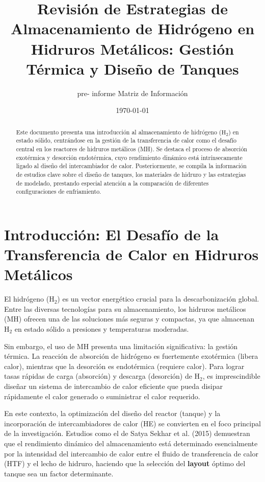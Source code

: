 \documentclass{article}
\title{Revisión de Estrategias de Almacenamiento de Hidrógeno en Hidruros Metálicos: Gestión Térmica y Diseño de Tanques}
\author{pre- informe  Matriz de Información}
\date{\today}
\begin{document}
\maketitle

\begin{abstract}
Este documento presenta una introducción al almacenamiento de hidrógeno ($\text{H}_2$) en estado sólido, centrándose en la gestión de la transferencia de calor como el desafío central en los reactores de hidruros metálicos (MH). Se destaca el proceso de absorción exotérmica y desorción endotérmica, cuyo rendimiento dinámico está intrínsecamente ligado al diseño del intercambiador de calor. Posteriormente, se compila la información de estudios clave sobre el diseño de tanques, los materiales de hidruro y las estrategias de modelado, prestando especial atención a la comparación de diferentes configuraciones de enfriamiento.
\end{abstract}

\section{Introducción: El Desafío de la Transferencia de Calor en Hidruros Metálicos}

El hidrógeno ($\text{H}_2$) es un vector energético crucial para la descarbonización global. Entre las diversas tecnologías para su almacenamiento, los hidruros metálicos (MH) ofrecen una de las soluciones más seguras y compactas, ya que almacenan $\text{H}_2$ en estado sólido a presiones y temperaturas moderadas.

Sin embargo, el uso de MH presenta una limitación significativa: la gestión térmica. La reacción de absorción de hidrógeno es fuertemente exotérmica (libera calor), mientras que la desorción es endotérmica (requiere calor). Para lograr tasas rápidas de carga (absorción) y descarga (desorción) de $\text{H}_2$, es imprescindible diseñar un sistema de intercambio de calor eficiente que pueda disipar rápidamente el calor generado o suministrar el calor requerido.

En este contexto, la optimización del diseño del reactor (tanque) y la incorporación de intercambiadores de calor (HE) se convierten en el foco principal de la investigación. Estudios como el de Satya Sekhar et al. (2015) demuestran que el rendimiento dinámico del almacenamiento está determinado esencialmente por la intensidad del intercambio de calor entre el fluido de transferencia de calor (HTF) y el lecho de hidruro, haciendo que la selección del \textbf{layout} óptimo del tanque sea un factor determinante.
\end{document}
